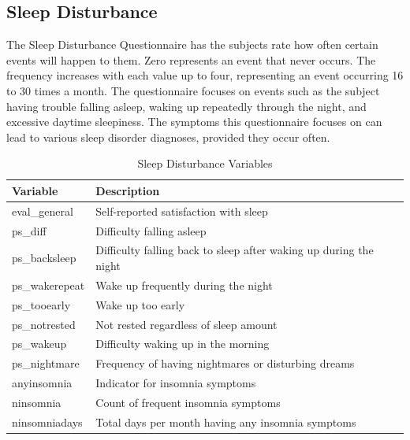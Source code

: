 \documentclass[10pt,conference,a4paper]{IEEEtran}
\begin{document}
\subsection{Sleep Disturbance}
\label{sleep_dis}

The Sleep Disturbance Questionnaire has the subjects rate how often certain events will happen to them. Zero represents an event that never occurs. The frequency increases with each value up to four, representing an event occurring 16 to 30 times a month. The questionnaire focuses on events such as the subject having trouble falling asleep, waking up repeatedly through the night, and excessive daytime sleepiness. The symptoms this questionnaire focuses on can lead to various sleep disorder diagnoses, provided they occur often.

\begin{table}[H]
\begin{tabular}{@{}p{}p{}@{}}
\toprule
Variable                            & Description                                                       \\ \midrule
\multicolumn{1}{l|}{eval\_general}  & Self-reported satisfaction with sleep                             \\
\multicolumn{1}{l|}{ps\_diff}       & Difficulty falling asleep                                         \\
\multicolumn{1}{l|}{ps\_backsleep}  & Difficulty falling back to sleep after waking up during the night \\
\multicolumn{1}{l|}{ps\_wakerepeat} & Wake up frequently during the night                               \\
\multicolumn{1}{l|}{ps\_tooearly}   & Wake up too early                                                 \\
\multicolumn{1}{l|}{ps\_notrested}  & Not rested regardless of sleep amount                             \\
\multicolumn{1}{l|}{ps\_wakeup}     & Difficulty waking up in the morning                               \\
\multicolumn{1}{l|}{ps\_nightmare}  & Frequency of having nightmares or disturbing dreams               \\
\multicolumn{1}{l|}{anyinsomnia}    & Indicator for insomnia symptoms                                   \\
\multicolumn{1}{l|}{ninsomnia}      & Count of frequent insomnia symptoms                               \\
\multicolumn{1}{l|}{ninsomniadays}  & Total days per month having any insomnia symptoms                 \\ \bottomrule
\end{tabular}
\caption{Sleep Disturbance Variables}
\end{table}
\end{document}
